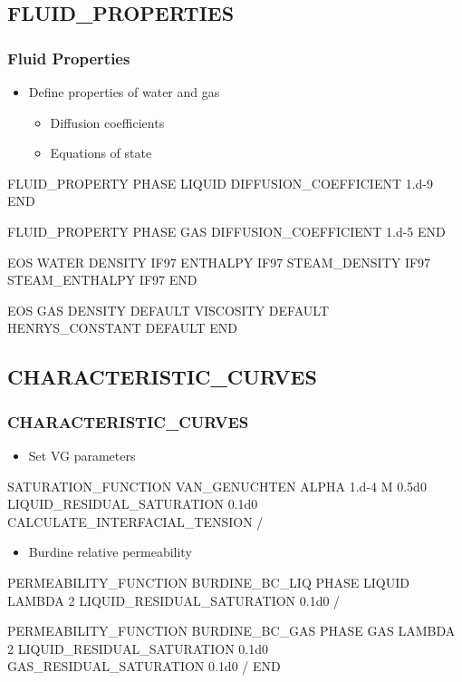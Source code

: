 \documentclass{beamer}
\begin{document}
\subsection{FLUID\_PROPERTIES}
\begin{frame}\frametitle{Fluid Properties}

\begin{itemize}
  \item Define properties of water and gas
  \begin{itemize}
    \item Diffusion coefficients
    \item Equations of state
  \end{itemize}
\end{itemize}

\begin{semiverbatim}
FLUID_PROPERTY
  PHASE LIQUID
  DIFFUSION_COEFFICIENT 1.d-9
END

FLUID_PROPERTY
  PHASE GAS
  DIFFUSION_COEFFICIENT 1.d-5
END

\newpage

EOS WATER
  DENSITY IF97
  ENTHALPY IF97
  STEAM_DENSITY IF97
  STEAM_ENTHALPY IF97
END

EOS GAS
  DENSITY DEFAULT
  VISCOSITY DEFAULT
  HENRYS_CONSTANT DEFAULT
END

\end{semiverbatim}

\end{frame}

\subsection{CHARACTERISTIC\_CURVES}

\begin{frame}\frametitle{CHARACTERISTIC\_CURVES}

\begin{itemize}
\item Set VG parameters
\end{itemize}

\begin{semiverbatim}
SATURATION_FUNCTION VAN_GENUCHTEN
    ALPHA 1.d-4
    M 0.5d0
    LIQUID_RESIDUAL_SATURATION 0.1d0
    CALCULATE_INTERFACIAL_TENSION
  /
\end{semiverbatim}

\newpage
\begin{itemize}
\item Burdine relative permeability
\end{itemize}

\begin{semiverbatim}
  PERMEABILITY_FUNCTION BURDINE_BC_LIQ
    PHASE LIQUID
    LAMBDA 2
    LIQUID_RESIDUAL_SATURATION 0.1d0
  /

  PERMEABILITY_FUNCTION BURDINE_BC_GAS
    PHASE GAS
    LAMBDA 2
    LIQUID_RESIDUAL_SATURATION 0.1d0
    GAS_RESIDUAL_SATURATION 0.1d0
  /
END
\end{semiverbatim}

\end{frame}
\end{document}
